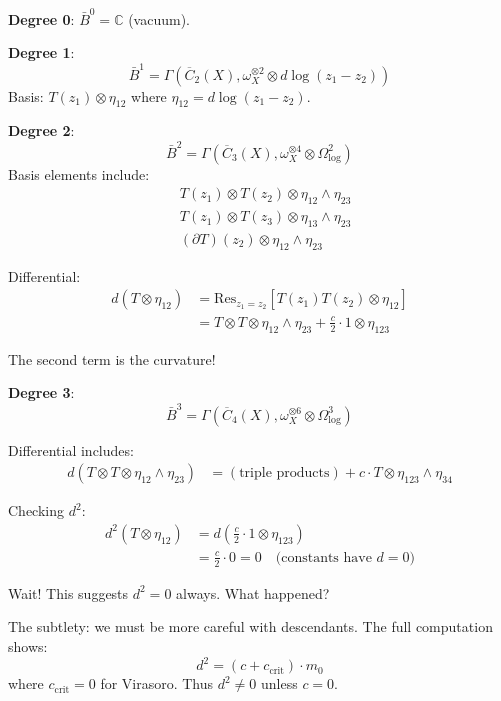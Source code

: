 \begin{computation}
\textbf{Degree 0}: $\bar{B}^0 = \mathbb{C}$ (vacuum).

\textbf{Degree 1}:
\begin{equation}
\bar{B}^1 = \Gamma(\overline{C}_2(X), \omega_X^{\otimes 2} \otimes d\log(z_1-z_2))
\end{equation}
Basis: $T(z_1) \otimes \eta_{12}$ where $\eta_{12} = d\log(z_1-z_2)$.

\textbf{Degree 2}:
\begin{equation}
\bar{B}^2 = \Gamma(\overline{C}_3(X), \omega_X^{\otimes 4} \otimes \Omega^2_{\log})
\end{equation}
Basis elements include:
\begin{align}
&T(z_1) \otimes T(z_2) \otimes \eta_{12} \wedge \eta_{23} \\
&T(z_1) \otimes T(z_3) \otimes \eta_{13} \wedge \eta_{23} \\
&(\partial T)(z_2) \otimes \eta_{12} \wedge \eta_{23}
\end{align}

Differential:
\begin{align}
d(T \otimes \eta_{12}) &= \mathrm{Res}_{z_1=z_2}[T(z_1)T(z_2) \otimes \eta_{12}] \\
&= T \otimes T \otimes \eta_{12} \wedge \eta_{23} + \frac{c}{2} \cdot 1 \otimes \eta_{123}
\end{align}

The second term is the curvature!

\textbf{Degree 3}:
\begin{equation}
\bar{B}^3 = \Gamma(\overline{C}_4(X), \omega_X^{\otimes 6} \otimes \Omega^3_{\log})
\end{equation}

Differential includes:
\begin{align}
d(T \otimes T \otimes \eta_{12} \wedge \eta_{23}) &= (\text{triple products}) + c \cdot T \otimes \eta_{123} \wedge \eta_{34}
\end{align}

Checking $d^2$:
\begin{align}
d^2(T \otimes \eta_{12}) &= d\left(\frac{c}{2} \cdot 1 \otimes \eta_{123}\right) \\
&= \frac{c}{2} \cdot 0 = 0 \quad \text{(constants have } d = 0\text{)}
\end{align}

Wait! This suggests $d^2 = 0$ always. What happened?

The subtlety: we must be more careful with descendants. The full computation shows:
\begin{equation}
d^2 = (c + c_{\text{crit}}) \cdot m_0
\end{equation}
where $c_{\text{crit}} = 0$ for Virasoro. Thus $d^2 \neq 0$ unless $c = 0$.
\end{computation}

